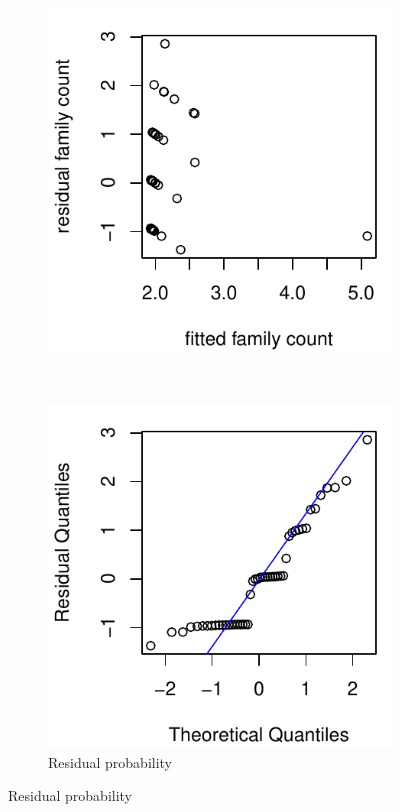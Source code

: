 \documentclass[10pt,letterpaper,twocolumn]{article}
\begin{document}
\begin{figure}[h]
\begin{subfigure}[b]{0.15\textwidth}
		\includegraphics[width=\textwidth]{plots/mass-vs-count/residual/2015_sweep_Coleoptera_residual.pdf}
		\label{fig:sweep_coleoptera_resid}
	\end{subfigure}
	~
	\begin{subfigure}[b]{0.15\textwidth}
		\caption{Residual probability}
		\includegraphics[width=\textwidth]{plots/mass-vs-count/qqplot/2015_sweep_Coleoptera_qqplot.pdf}

\end{subfigure}
\end{figure}
\end{document}
